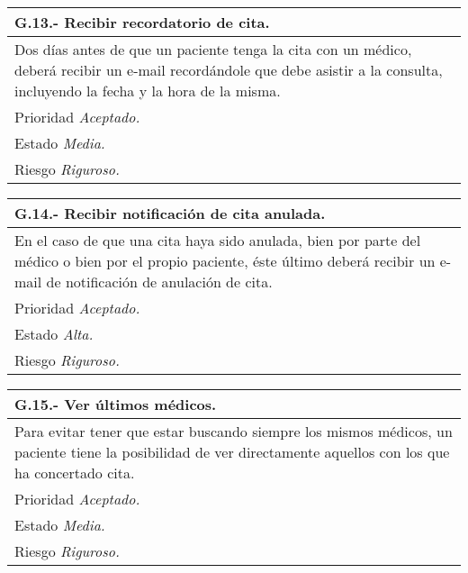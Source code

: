 \documentclass[a4paper,oneside,11pt]{book}
\begin{document}
\begin{center}
\begin{tabulary}{15cm}{|L|}
	\hline
		\bf{G.13.- Recibir recordatorio de cita.} \\
	\hline
		Dos días antes de que un paciente tenga la cita con un médico, deberá recibir un e-mail recordándole que debe asistir a la consulta, incluyendo la fecha y la hora de la misma.\\
	\hline
		Prioridad \textit{Aceptado.} \\
	\hline
		Estado \textit{Media.} \\
	\hline
		Riesgo \textit{Riguroso.} \\
	\hline
\end{tabulary}
\end{center}

\begin{center}
\begin{tabulary}{15cm}{|L|}
	\hline
		\bf{G.14.- Recibir notificación de cita anulada.} \\
	\hline
		En el caso de que una cita haya sido anulada, bien por parte del médico o bien por el propio paciente, éste último deberá recibir un e-mail de notificación de anulación de cita.\\
	\hline
		Prioridad \textit{Aceptado.} \\
	\hline
		Estado \textit{Alta.} \\
	\hline
		Riesgo \textit{Riguroso.} \\
	\hline
\end{tabulary}
\end{center}

\begin{center}
\begin{tabulary}{15cm}{|L|}
	\hline
		\bf{G.15.- Ver últimos médicos.} \\
	\hline
		Para evitar tener que estar buscando siempre los mismos médicos, un paciente tiene la posibilidad de ver directamente aquellos con los que ha concertado cita. \\
	\hline
		Prioridad \textit{Aceptado.} \\
	\hline
		Estado \textit{Media.} \\
	\hline
		Riesgo \textit{Riguroso.} \\
	\hline
\end{tabulary}
\end{center}
\end{document}
